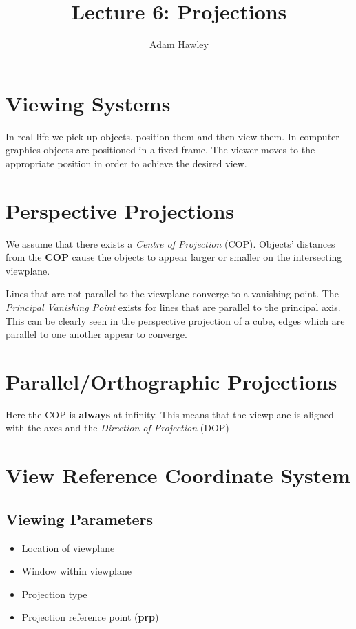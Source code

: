 \documentclass{article}
\author{Adam Hawley}
\title{Lecture 6: Projections}
\begin{document}
\maketitle

\section{Viewing Systems}
In real life we pick up objects, position them and then view them.
In computer graphics objects are positioned in a fixed frame.
The viewer moves to the appropriate position in order to achieve the desired view.

\section{Perspective Projections}
We assume that there exists a {\it Centre of Projection} (COP).
Objects' distances from the {\bf COP} cause the objects to appear larger or smaller on the intersecting viewplane. %

Lines that are not parallel to the viewplane converge to a vanishing point. 
The {\it Principal Vanishing Point} exists for lines that are parallel to the principal axis.  
This can be clearly seen in the perspective projection of a cube, edges which are parallel to one another appear to converge. %

\section{Parallel/Orthographic Projections}
Here the COP is {\bf always} at infinity.
This means that the viewplane is aligned with the axes and the {\it Direction of Projection} (DOP)

\section{View Reference Coordinate System}
\subsection{Viewing Parameters}
\begin{itemize}
	\item Location of viewplane
	\item Window within viewplane
	\item Projection type
	\item Projection reference point ({\bf prp})
\end{itemize} 
\end{document}
